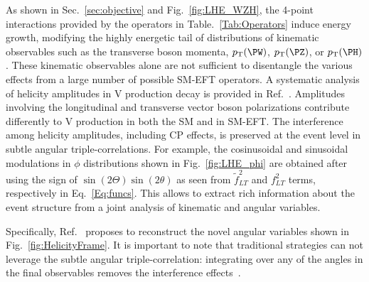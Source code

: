\documentclass[a4paper,11pt]{article}
\renewcommand{\PV}{{{{V}}}\xspace}
\newcommand{\VH}{{{\PV}{\PH}}\xspace}
\begin{document}
As shown in Sec.~\ref{sec:objective} and Fig.~\ref{fig:LHE_WZH}, the 4-point interactions provided by the operators in Table.~\ref{Tab:Operators} induce  energy growth, modifying the highly energetic tail of distributions of kinematic observables such as the transverse boson momenta, $\pt(\PW)$, $\pt(\PZ)$, or $\pt(\PH)$. 
These kinematic observables alone are not sufficient to disentangle the various effects from a large number of possible SM-EFT operators. 
A systematic analysis of helicity amplitudes in \VH production decay is provided in Ref.~\cite{Banerjee:2019twi}. 
Amplitudes involving the longitudinal and transverse vector boson polarizations contribute differently to \VH production in both the SM and in SM-EFT. 
The interference among helicity amplitudes, including CP effects, is preserved at the event level in subtle angular triple-correlations. 
For example, the cosinusoidal and sinusoidal modulations in $\phi$ distributions shown in Fig.~\ref{fig:LHE_phi} are obtained after using the sign of $\sin\left(2\Theta\right)\sin\left(2\theta\right)$ as seen from $\tilde{f}^2_{LT}$ and $f^2_{LT}$ terms, respectively in  Eq.~\ref{Eq:funcs}. 
This allows to extract rich information about the event structure from a joint analysis of kinematic and angular variables.

Specifically, Ref.~\cite{Banerjee:2019twi} proposes to reconstruct the novel angular variables shown in Fig.~\ref{fig:HelicityFrame}. 
It is important to note that traditional strategies can not leverage the subtle angular triple-correlation: integrating over any of the angles in the final observables removes the interference effects~\cite{Panico:2017frx}.
\end{document}
